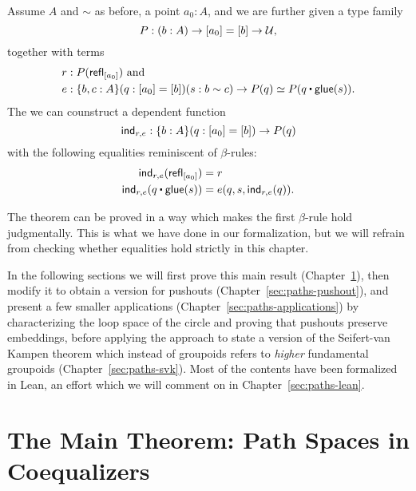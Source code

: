 \begin{thm}\label{thm:paths-main-thm}
Assume $A$ and $\sim$ as before, a point $a_0 : A$, and we are further given
a type family
\begin{equation*}
P : (b : A) \to [a_0] = [b] \to \mathcal{U} \text{,}
\end{equation*}
together with terms
\begin{align*}
r &: P(\refl_{[a_0]}) \text{ and} \\
e &: \{b, c : A\}(q : [a_0] = [b])(s : b \sim c) \to P(q) \simeq P(q \ct \glue(s)) \text{.}
\end{align*}
The we can counstruct a dependent function
\begin{equation*}
\mathsf{ind}_{r, e} : \{b : A\}(q : [a_0] = [b]) \to P(q)
\end{equation*}
with the following equalities reminiscent of $\beta$-rules:
\begin{align}
\ind_{r,e} (\refl_{[a_0]}) &= r \label{eq:paths-thm-based-first-beta} \\
\ind_{r,e}(q \ct \glue(s)) &= e (q,s, \mathsf{ind}_{r,e}(q)) \label{eq:paths-thm-based-second-beta} \text{.}
\end{align}
\end{thm}

\begin{remark}
The theorem can be proved in a way which makes the first $\beta$-rule hold judgmentally.
This is what we have done in our formalization, but we will refrain from checking
whether equalities hold strictly in this chapter.
\end{remark}

In the following sections we will first prove this main result (Chapter~\ref{sec:paths-main}),
then modify it to obtain a version for pushouts (Chapter~\ref{sec:paths-pushout}),
and present a few smaller applications (Chapter~\ref{sec:paths-applications})
by characterizing the loop space of the circle and proving that
pushouts preserve embeddings,
before applying the approach to state a version of the Seifert-van Kampen theorem
which instead of groupoids refers to \emph{higher} fundamental groupoids
(Chapter~\ref{sec:paths-svk}).
Most of the contents have been formalized in Lean, an effort which we will
comment on in Chapter~\ref{sec:paths-lean}.

\section{The Main Theorem: Path Spaces in Coequalizers}\label{sec:paths-main}

